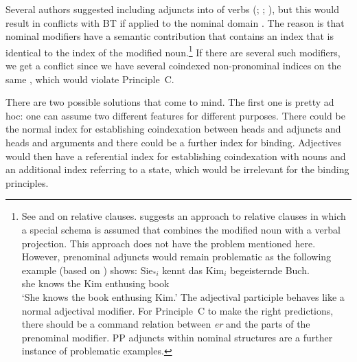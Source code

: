 \documentclass[output=paper
	        ,collection
	        ,collectionchapter
 	        ,biblatex
                ,babelshorthands
                ,newtxmath
                ,draftmode
                ,colorlinks, citecolor=brown
]{langscibook}
\begin{document}
Several authors suggested including adjuncts into \argstls of verbs
(\citealp[]{Chung98}; \citealp[]{Prze99}; \citealp*[]{MSI99a}), but this would
result in conflicts with BT if applied to the nominal domain \citep[Section~20.4.1.]{Mueller99a}. The reason is that nominal modifiers have a semantic contribution that
contains an index that is identical to the index of the modified noun.\footnote{%
See  and
 on relative clauses. \citet{Sag97a} suggests an approach to relative clauses in
which a special schema is assumed that combines the modified noun with a verbal projection. This
approach does not have the problem mentioned here. However, prenominal adjuncts would remain
problematic as the following example (based on ) shows:
\ea
\gll Sie$_{*i}$ kennt das Kim$_i$ begeisternde Buch.\\
     she        knows the Kim     enthusing    book\\
\glt `She knows the book enthusing Kim.'
\z
The adjectival participle behaves like a normal adjectival modifier. For Principle~C to make the
right predictions, there should be a command relation between \emph{er} and the parts of the
prenominal modifier. PP adjuncts within nominal structures are a further instance of problematic examples.%
} If there are several such modifiers, we get a conflict since we have several coindexed non-pronominal indices on the same
\argstl, which would violate Principle~C. 

There are two possible solutions that come to mind. The first one is pretty ad
hoc: one can assume two different features for different purposes. There could be the normal index
for establishing coindexation between heads and adjuncts and heads and arguments and there could be
a further index for binding. Adjectives would then have a referential index for establishing
coindexation with nouns and an additional index referring to a state, which would be irrelevant for the
binding principles.
\end{document}
